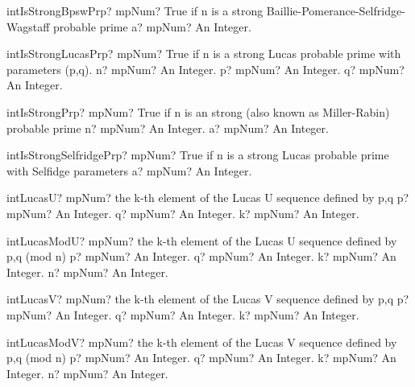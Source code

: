 \documentclass[12pt,a4paper,openany]{book}
\begin{document}
\begin{mpFunctionsExtract}
\mpFunctionOne
{intIsStrongBpswPrp? mpNum? True if n is a strong Baillie-Pomerance-Selfridge-Wagstaff probable prime}
{a? mpNum? An Integer.}
\end{mpFunctionsExtract}

\begin{mpFunctionsExtract}
\mpFunctionThree
{intIsStrongLucasPrp? mpNum? True if n is a strong Lucas probable prime with parameters (p,q).}
{n? mpNum? An Integer.}
{p? mpNum? An Integer.}
{q? mpNum? An Integer.}
\end{mpFunctionsExtract}

\begin{mpFunctionsExtract}
\mpFunctionTwo
{intIsStrongPrp? mpNum? True if n is an strong (also known as Miller-Rabin) probable prime}
{n? mpNum? An Integer.}
{a? mpNum? An Integer.}
\end{mpFunctionsExtract}

\begin{mpFunctionsExtract}
\mpFunctionOne
{intIsStrongSelfridgePrp? mpNum? True if n is a strong Lucas probable prime with Selfidge parameters}
{a? mpNum? An Integer.}
\end{mpFunctionsExtract}

\begin{mpFunctionsExtract}
\mpFunctionThree
{intLucasU? mpNum? the k-th element of the Lucas U sequence defined by p,q}
{p? mpNum? An Integer.}
{q? mpNum? An Integer.}
{k? mpNum? An Integer.}
\end{mpFunctionsExtract}

\begin{mpFunctionsExtract}
\mpFunctionFour
{intLucasModU? mpNum? the k-th element of the Lucas U sequence defined by p,q (mod n)}
{p? mpNum? An Integer.}
{q? mpNum? An Integer.}
{k? mpNum? An Integer.}
{n? mpNum? An Integer.}
\end{mpFunctionsExtract}

\begin{mpFunctionsExtract}
\mpFunctionThree
{intLucasV? mpNum? the k-th element of the Lucas V sequence defined by p,q}
{p? mpNum? An Integer.}
{q? mpNum? An Integer.}
{k? mpNum? An Integer.}
\end{mpFunctionsExtract}

\begin{mpFunctionsExtract}
\mpFunctionFour
{intLucasModV? mpNum? the k-th element of the Lucas V sequence defined by p,q (mod n)}
{p? mpNum? An Integer.}
{q? mpNum? An Integer.}
{k? mpNum? An Integer.}
{n? mpNum? An Integer.}
\end{mpFunctionsExtract}
\end{document}

